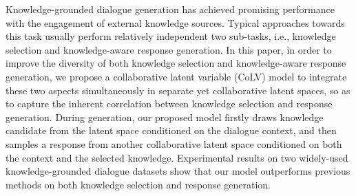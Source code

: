 Knowledge-grounded dialogue generation has achieved promising performance with the engagement of external knowledge sources. Typical approaches towards this task usually perform relatively independent two sub-tasks, i.e., knowledge selection and knowledge-aware response generation. In this paper, in order to improve the diversity of both knowledge selection and knowledge-aware response generation, we propose a collaborative latent variable (CoLV) model to integrate these two aspects simultaneously in separate yet collaborative latent spaces, so as to capture the inherent correlation between knowledge selection and response generation. During generation, our proposed model firstly draws knowledge candidate from the latent space conditioned on the dialogue context, and then samples a response from another collaborative latent space conditioned on both the context and the selected knowledge. Experimental results on two widely-used knowledge-grounded dialogue datasets show that our model outperforms previous methods on both knowledge selection and response generation.
